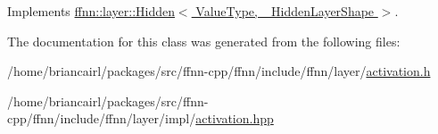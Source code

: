 Implements \hyperlink{classffnn_1_1layer_1_1_hidden_ae038d2a1e64fcbbde6166df7d0573ef8}{ffnn\-::layer\-::\-Hidden$<$ Value\-Type, \-\_\-\-Hidden\-Layer\-Shape $>$}.



The documentation for this class was generated from the following files\-:\begin{DoxyCompactItemize}
\item 
/home/briancairl/packages/src/ffnn-\/cpp/ffnn/include/ffnn/layer/\hyperlink{activation_8h}{activation.\-h}\item 
/home/briancairl/packages/src/ffnn-\/cpp/ffnn/include/ffnn/layer/impl/\hyperlink{activation_8hpp}{activation.\-hpp}\end{DoxyCompactItemize}
